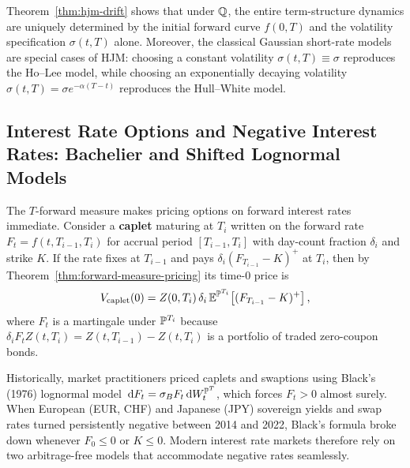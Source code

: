 Theorem~\ref{thm:hjm-drift} shows that under $\mathbb{Q}$, the entire term-structure dynamics are uniquely determined by the initial forward curve $f(0, T)$ and the volatility specification $\sigma(t, T)$ alone. Moreover, the classical Gaussian short-rate models are special cases of HJM: choosing a constant volatility $\sigma(t, T) \equiv \sigma$ reproduces the Ho--Lee model, while choosing an exponentially decaying volatility $\sigma(t, T) = \sigma e^{-\alpha(T-t)}$ reproduces the Hull--White model.

\subsection*{Interest Rate Options and Negative Interest Rates: Bachelier and Shifted Lognormal Models}
The $T$-forward measure makes pricing options on forward interest rates immediate. Consider a \textbf{caplet} maturing at $T_i$ written on the forward rate $F_t = f(t, T_{i-1}, T_i)$ for accrual period $[T_{i-1}, T_i]$ with day-count fraction $\delta_i$ and strike $K$. If the rate fixes at $T_{i-1}$ and pays $\delta_i(F_{T_{i-1}} - K)^+$ at $T_i$, then by Theorem~\ref{thm:forward-measure-pricing} its time-$0$ price is
\[
V_{\mathrm{caplet}}(0) = Z(0, T_i)\,\delta_i\,\mathbb{E}^{\mathbb{P}^{T_i}}\!\left[(F_{T_{i-1}} - K)^+\right],
\]
where $F_t$ is a martingale under $\mathbb{P}^{T_i}$ because $\delta_i F_t Z(t, T_i) = Z(t, T_{i-1}) - Z(t, T_i)$ is a portfolio of traded zero-coupon bonds.

Historically, market practitioners priced caplets and swaptions using Black's (1976) lognormal model $\,\mathrm{d} F_t = \sigma_B F_t\,\mathrm{d} W_t^{\mathbb{P}^T}$, which forces $F_t > 0$ almost surely. When European (EUR, CHF) and Japanese (JPY) sovereign yields and swap rates turned persistently negative between 2014 and 2022, Black's formula broke down whenever $F_0 \leq 0$ or $K \leq 0$. Modern interest rate markets therefore rely on two arbitrage-free models that accommodate negative rates seamlessly.

